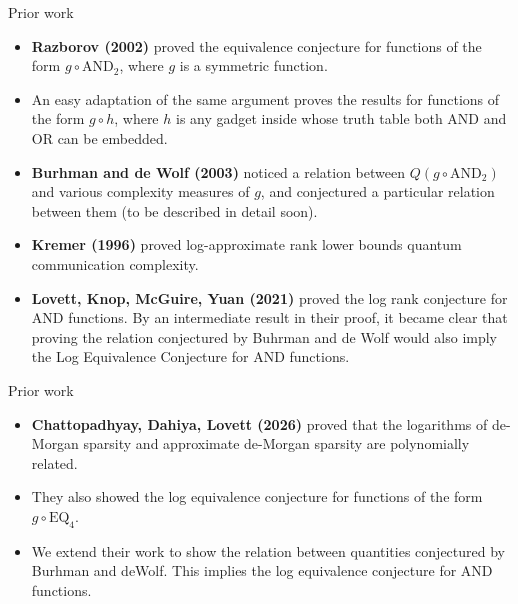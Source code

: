 \begin{frame}{Prior work}
	\begin{itemize}
		\item<1-> \textbf{Razborov (2002)} proved the equivalence conjecture for functions of the form $g \circ \text{AND}_2$, where $g$ is a symmetric function. 
		\item<2-> An easy adaptation of the same argument proves the results for functions of the form $g \circ h$, where $h$ is any gadget inside whose truth table both AND and OR can be embedded.
		\item<3-> \textbf{Burhman and de Wolf (2003)} noticed a relation between $Q(g \circ \text{AND}_2)$ and various complexity measures of $g$, and conjectured a particular relation between them (to be described in detail soon).
		\item<4->\textbf{Kremer (1996)} proved log-approximate rank lower bounds quantum communication complexity.
		\item<5-> \textbf{Lovett, Knop, McGuire, Yuan (2021)} proved the log rank conjecture for AND functions. By an intermediate result in their proof, it became  clear that proving the relation conjectured by Buhrman and de Wolf would also imply the Log Equivalence Conjecture for $\text{AND}$ functions.
	\end{itemize}
	
\end{frame}



\begin{frame}{Prior work}
	\begin{itemize}
		\item<1-> \textbf{Chattopadhyay, Dahiya, Lovett (2026)} proved that the logarithms of de-Morgan sparsity and approximate de-Morgan sparsity are polynomially related.
		\item<2-> They also showed the log equivalence conjecture for functions of the form $g \circ \text{EQ}_4$.
		\item<3-> We extend their work to show the relation between quantities conjectured by Burhman and deWolf. This implies the log equivalence conjecture for AND functions.
	\end{itemize}
	
\end{frame}